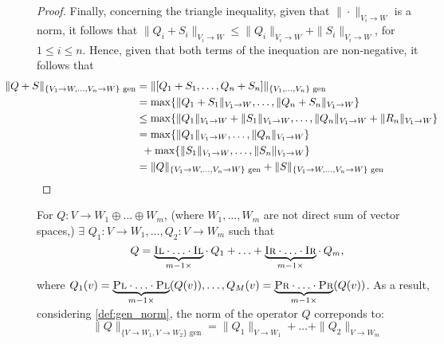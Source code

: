 \begin{proof}
  Finally, concerning the triangle inequality, given that $\|\cdot \|_{V_i \rightarrow W}$ is a norm, it follows that $\|Q_i + S_i\|_{V_i \rightarrow W} \leq \|Q_i\|_{V_i \rightarrow W} + \|S_i\|_{V_i \rightarrow W}$, for $1 \leq i \leq n$. Hence, given that both terms of the inequation are non-negative, it follows that
  \begin{align*}
   \hspace{-30pt} \|Q + S\|_{\{V_1\rightarrow W, \ldots, V_n\rightarrow W\} \text{ gen}} & = \|[Q_1 + S_1, \ldots, Q_n + S_n]\|_{\{V_1, \ldots, V_n\} \text{ gen}} \\
    & = \max \{\|Q_1 + S_1\|_{V_1 \rightarrow W}, \ldots, \|Q_n + S_n\|_{V_1 \rightarrow W}  \} \\
    & \leq \max \{\|Q_1\|_{V_1 \rightarrow W} + \|S_1\|_{V_1 \rightarrow W}, \ldots, \|Q_n\|_{V_1 \rightarrow W} + \|R_n\|_{V_1 \rightarrow W}  \} \\
    & = \max \{\|Q_1\|_{V_1 \rightarrow W}, \ldots, \|Q_n\|_{V_1 \rightarrow W}  \}  \\
    & \hspace{5pt} + \max \{\|S_1\|_{V_1 \rightarrow W}, \ldots, \|S_n\|_{V_1 \rightarrow W}  \} \\
    & = \|Q\|_{\{V_1\rightarrow W, \ldots, V_n\rightarrow W\} \text{ gen}} + \|S\|_{\{V_1\rightarrow W, \ldots, V_n\rightarrow W\} \text{ gen}}
  \end{align*}
\end {proof}




\vspace{5pt}


\begin{definition} \label{def:gen_norm_gen_inj}
  For $Q: V \rightarrow W_1 \oplus \ldots \oplus W_m$, (where  $W_1, \ldots, W_m$  are not direct sum of vector spaces,) $\exists$ $Q_1: V \rightarrow W_1, \ldots,Q_2: V \rightarrow W_m$ such that 
  $$Q = \underbrace{\textsc{Il} \cdot \ldots \cdot \textsc{Il}}_{m-1 \times } \cdot \hspace{2pt} Q_1 + \ldots + \underbrace{\textsc{Ir} \cdot \ldots \cdot \textsc{Ir}}_{m-1 \times } \cdot  \hspace{2pt} Q_m,$$
   where $Q_1 (v) =  \underbrace{\textsc{Pl} \cdot \ldots \cdot \textsc{Pl}}_{m-1 \times } (Q (v)), \ldots, Q_M (v) =   \underbrace{\textsc{Pr} \cdot \ldots \cdot \textsc{Pr}}_{m-1 \times } (Q(v))$. As a result, considering \autoref{def:gen_norm}, the norm of the operator $Q$ correponds to:
  \begin{equation}
    \|Q\|_{\{V \rightarrow W_1, V \rightarrow W_2\} \text{ gen}} =  \| Q_1\|_{V \rightarrow W_1} + \ldots + \|Q_2\|_{V \rightarrow W_m}
  \end{equation}
\end{definition}

